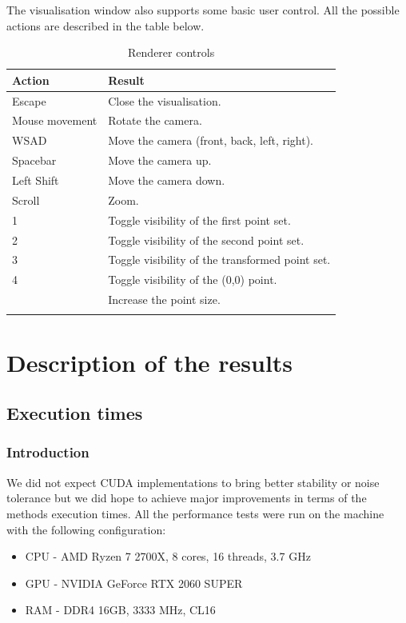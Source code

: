 \documentclass[titlepage]{article}
\begin{document}
The visualisation window also supports some basic user control. All the possible actions are described in the table below.
\begin{center}
\def\arraystretch{1.5}
\begin{longtable}{ | m{13em} | m{27em}| } 
 \hline
 Action & Result \\
 \hline
 \hline
 Escape & Close the visualisation. \\
 \hline
 Mouse movement & Rotate the camera. \\
 \hline
 WSAD & Move the camera (front, back, left, right). \\
 \hline
 Spacebar & Move the camera up. \\
 \hline
 Left Shift & Move the camera down. \\
 \hline
 Scroll & Zoom. \\
 \hline
 1 & Toggle visibility of the first point set. \\
 \hline
 2 & Toggle visibility of the second point set. \\
 \hline
 3 & Toggle visibility of the transformed point set. \\
 \hline
 4 & Toggle visibility of the (0,0) point. \\
 \hline
 [ & Reduce the point size. \\
 \hline
 ] & Increase the point size. \\
 \hline
 \caption{Renderer controls}
\end{longtable}
\label{tab:controls}
\end{center}

\section{Description of the results}

\subsection{Execution times}
\subsubsection{Introduction}
We did not expect CUDA implementations to bring better stability or noise tolerance but we did hope to achieve major improvements in terms of the methods execution times. All the performance tests were run on the machine with the following configuration:
\begin{itemize}
\item CPU - AMD Ryzen 7 2700X, 8 cores, 16 threads, 3.7 GHz
\item GPU - NVIDIA GeForce RTX 2060 SUPER
\item RAM - DDR4 16GB, 3333 MHz, CL16
\end{itemize}
\end{document}
